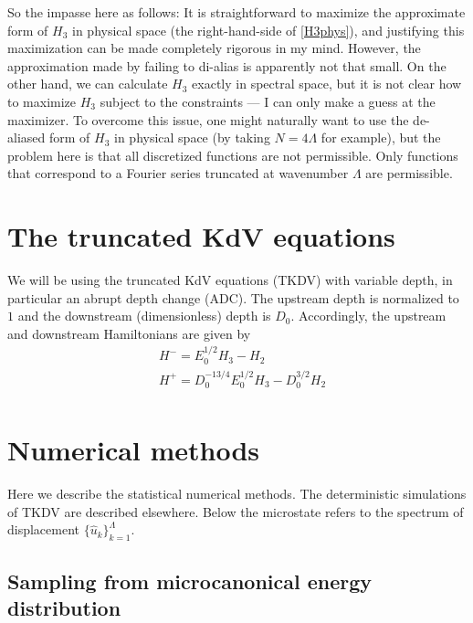 \documentclass[12pt]{article}
\newcommand{\uhat}{\hat{u}}
\begin{document}
So the impasse here as follows: It is straightforward to maximize the approximate form of $H_3$ in physical space (the right-hand-side of \eqref{H3phys}), and justifying this maximization can be made completely rigorous in my mind. However, the approximation made by failing to di-alias is apparently not that small. On the other hand, we can calculate $H_3$ exactly in spectral space, but it is not clear how to maximize $H_3$ subject to the constraints --- I can only make a guess at the maximizer. To overcome this issue, one might naturally want to use the de-aliased form of $H_3$ in physical space (by taking $N = 4 \Lambda$ for example), but the problem here is that all discretized functions are not permissible. Only functions that correspond to a Fourier series truncated at wavenumber $\Lambda$ are permissible.


\section{The truncated KdV equations}

We will be using the truncated KdV equations (TKDV) with variable depth, in particular an abrupt depth change (ADC). The upstream depth is normalized to $1$ and the downstream (dimensionless) depth is $D_0$. Accordingly, the upstream and downstream Hamiltonians are given by
\begin{align}
\label{Hamiltonian}
& H^- = E_0^{1/2} H_3 - H_2 \\
& H^+ = D_0^{-13/4} E_0^{1/2} H_3 - D_0^{3/2} H_2 \\
\end{align}


\section{Numerical methods}

Here we describe the statistical numerical methods. The deterministic simulations of TKDV are described elsewhere. Below the microstate refers to the spectrum of displacement $\{ \uhat_k \}_{k=1}^{\Lambda}$.

\subsection{Sampling from microcanonical energy distribution}
\label{sec_microcan}
\end{document}

